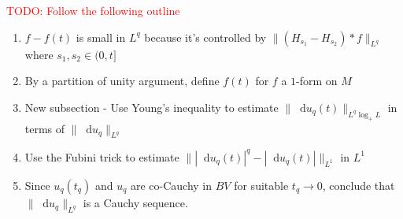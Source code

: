 \documentclass[reqno,11pt]{amsart}
\newcommand*\dif{\mathop{}\!\mathrm{d}}
\theoremstyle{definition}
\numberwithin{equation}{section}
\newcommand\todo[1]{\textcolor{red}{TODO: #1}}
\begin{document}
\todo{Follow the following outline}
\begin{enumerate}
	\item $f - f(t)$ is small in $L^q$ because it's controlled by $\|(H_{s_1} - H_{s_2}) * f\|_{L^q}$ where $s_1, s_2 \in (0, t]$
	\item By a partition of unity argument, define $f(t)$ for $f$ a $1$-form on $M$
	\item New subsection - Use Young's inequality to estimate $\|\dif u_q(t)\|_{L^q \log_+ L}$ in terms of $\|\dif u_q\|_{L^q}$
	\item Use the Fubini trick to estimate $\||\dif u_q(t)|^q - |\dif u_q(t)|\|_{L^1}$ in $L^1$ 
	\item Since $u_q(t_q)$ and $u_q$ are co-Cauchy in $BV$ for suitable $t_q \to 0$, conclude that $\|\dif u_q\|_{L^q}$ is a Cauchy sequence.
\end{enumerate}


\end{document}
